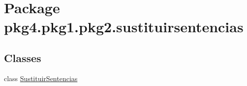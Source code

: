 \hypertarget{namespacepkg4_1_1pkg1_1_1pkg2_1_1sustituirsentencias}{}\section{Package pkg4.\+pkg1.\+pkg2.\+sustituirsentencias}
\label{namespacepkg4_1_1pkg1_1_1pkg2_1_1sustituirsentencias}
\subsection*{Classes}
\begin{DoxyCompactItemize}
\item 
class \mbox{\hyperlink{classpkg4_1_1pkg1_1_1pkg2_1_1sustituirsentencias_1_1_sustituir_sentencias}{Sustituir\+Sentencias}}
\end{DoxyCompactItemize}
